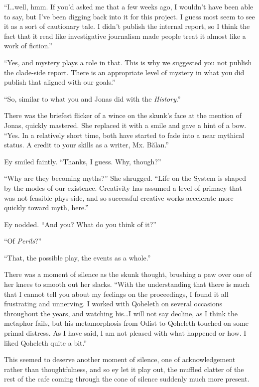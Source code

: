 ``I\ldots well, hmm. If you'd asked me that a few weeks ago, I wouldn't have been able to say, but I've been digging back into it for this project. I guess most seem to see it as a sort of cautionary tale. I didn't publish the internal report, so I think the fact that it read like investigative journalism made people treat it almost like a work of fiction.''

``Yes, and mystery plays a role in that. This is why we suggested you not publish the clade-side report. There is an appropriate level of mystery in what you did publish that aligned with our goals.''

``So, similar to what you and Jonas did with the \emph{History}.''

There was the briefest flicker of a wince on the skunk's face at the mention of Jonas, quickly mastered. She replaced it with a smile and gave a hint of a bow. ``Yes. In a relatively short time, both have started to fade into a near mythical status. A credit to your skills as a writer, Mx. Bălan.''

Ey smiled faintly. ``Thanks, I guess. Why, though?''

``Why are they becoming myths?'' She shrugged. ``Life on the System is shaped by the modes of our existence. Creativity has assumed a level of primacy that was not feasible phys-side, and so successful creative works accelerate more quickly toward myth, here.''

Ey nodded. ``And you? What do you think of it?''

``Of \emph{Perils}?''

``That, the possible play, the events as a whole.''

There was a moment of silence as the skunk thought, brushing a paw over one of her knees to smooth out her slacks. ``With the understanding that there is much that I cannot tell you about my feelings on the proceedings, I found it all frustrating and unnerving. I worked with Qoheleth on several occasions throughout the years, and watching his\ldots I will not say decline, as I think the metaphor fails, but his metamorphosis from Odist to Qoheleth touched on some primal distress. As I have said, I am not pleased with what happened or how. I liked Qoheleth quite a bit.''

This seemed to deserve another moment of silence, one of acknowledgement rather than thoughtfulness, and so ey let it play out, the muffled clatter of the rest of the cafe coming through the cone of silence suddenly much more present.

